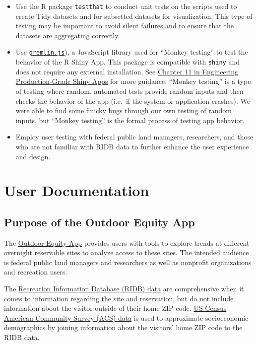 \documentclass[
  11 pt,
  openany]{book}
\providecommand{\tightlist}{%
  \setlength{\itemsep}{0pt}\setlength{\parskip}{0pt}}
\begin{document}
\begin{itemize}
\tightlist
\item
  Use the R package \texttt{testthat} \citep{R-testthat} to conduct unit tests on the scripts used to create Tidy datasets and for subsetted datasets for visualization. This type of testing may be important to avoid silent failures and to ensure that the datasets are aggregating correctly.
\item
  Use \href{https://github.com/marmelab/gremlins.js}{\texttt{gremlin.js}}), a JavaScript library used for ``Monkey testing'' to test the behavior of the R Shiny App. This package is compatible with \texttt{shiny} \citep{R-shiny} and does not require any external installation. See \href{https://engineering-shiny.org/build-yourself-safety-net.html}{Chapter 11 in Engineering Production-Grade Shiny Apps} for more guidance. ``Monkey testing'' is a type of testing where random, automated tests provide random inputs and then checks the behavior of the app (i.e.~if the system or application crashes). We were able to find some finicky bugs through our own testing of random inputs, but ``Monkey testing'' is the formal process of testing app behavior.
\item
  Employ user testing with federal public land managers, researchers, and those who are not familiar with RIDB data to further enhance the user experience and design.
\end{itemize}

\hypertarget{user-documentation}{%
\chapter{User Documentation}\label{user-documentation}}

\hypertarget{purpose-of-the-outdoor-equity-app}{%
\section{Purpose of the Outdoor Equity App}\label{purpose-of-the-outdoor-equity-app}}

The \href{https://shinyapps.bren.ucsb.edu/oe_app/}{Outdoor Equity App} provides users with tools to explore trends at different overnight reservable sites to analyze access to these sites. The intended audience is federal public land managers and researchers as well as nonprofit organizations and recreation users.

The \href{https://ridb.recreation.gov/landing}{Recreation Information Database (RIDB) data} are comprehensive when it comes to information regarding the site and reservation, but do not include information about the visitor outside of their home ZIP code. \href{https://www.census.gov/programs-surveys/acs/data.html}{US Census American Community Survey (ACS) data} is used to approximate socioeconomic demographics by joining information about the visitors' home ZIP code to the RIDB data.
\end{document}
